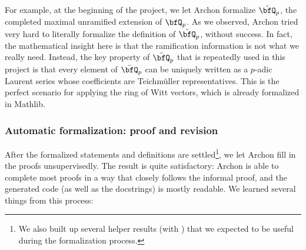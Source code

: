 \documentclass[english,oneside]{smfart}
\begin{document}
For example, at the beginning of the project, we let Archon formalize $\breve{\bfQ}_p$, the completed maximal unramified extension of $\bfQ_p$. As we observed, Archon tried very hard to literally formalize the definition of $\breve{\bfQ}_p$, without success. In fact, the mathematical insight here is that the ramification information is not what we really need. Instead, the key property of $\breve{\bfQ}_p$ that is repeatedly used in this project is that every element of $\breve{\bfQ}_p$ can be uniquely written as a $p$-adic Laurent series whose coefficients are Teichmüller representatives. This is the perfect scenario for applying the ring of Witt vectors, which is already formalized in Mathlib.

\subsubsection{Automatic formalization: proof and revision}
After the formalized statements and definitions are settled\footnote{We also built up several helper results (with ) that we expected to be useful during the formalization process.}, we let Archon fill in the proofs unsupervisedly. The result is quite satisfactory: Archon is able to complete most proofs in a way that closely follows the informal proof, and the generated code (as well as the docstrings) is mostly readable. We learned several things from this process:
\end{document}
